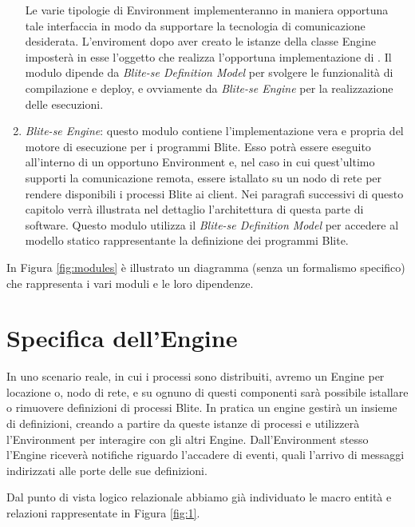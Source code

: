 \begin{enumerate}
	Le varie tipologie di Environment implementeranno in maniera opportuna tale
	interfaccia in modo da supportare la tecnologia di comunicazione desiderata.
	L'enviroment dopo aver creato le istanze della classe Engine imposterà in esse
	l'oggetto che realizza l'opportuna implementazione di
	. Il modulo dipende da \emph{Blite-se Definition Model}
	per svolgere le funzionalità di compilazione e deploy, e ovviamente da
	\emph{Blite-se Engine} per la realizzazione delle esecuzioni.
	
  \item \emph{Blite-se Engine}: questo modulo contiene l'implementazione vera
  e propria del motore di esecuzione per i programmi Blite. Esso potrà essere
  eseguito all'interno di un opportuno Environment e, nel caso in cui
  quest'ultimo supporti la comunicazione remota, essere istallato su un nodo di
  rete per rendere disponibili i processi Blite ai client. Nei
  paragrafi successivi di questo capitolo verrà illustrata nel dettaglio
  l'architettura di questa parte di software. Questo modulo utilizza il
  \emph{Blite-se Definition Model} per accedere al modello statico
  rappresentante la definizione dei programmi Blite.
  
\end{enumerate}

In Figura \ref{fig:modules} è illustrato un diagramma (senza un
formalismo specifico) che rappresenta i vari moduli e le loro dipendenze.
\newpage

\section{Specifica dell'Engine}

In uno scenario reale, in cui i processi sono distribuiti, avremo un Engine per
locazione o, nodo di rete, e su ognuno di questi componenti sarà possibile
istallare o rimuovere definizioni di processi Blite. In pratica un engine
gestir\`a un insieme di definizioni, creando a partire da queste istanze di
processi e utilizzerà l'Environment per interagire con gli altri Engine. 
Dall'Environment stesso l'Engine riceverà notifiche riguardo l'accadere di
eventi, quali l'arrivo di messaggi indirizzati alle porte delle sue definizioni.

Dal punto di vista logico relazionale abbiamo già individuato le
macro entità e relazioni rappresentate in Figura \ref{fig:1}.

